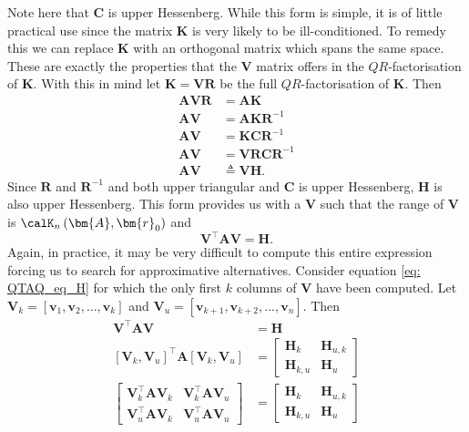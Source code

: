 Note here that $\bm{C}$ is upper Hessenberg. While this form is simple, it is of little practical use since the matrix $\bm{K}$ is very likely to be ill-conditioned. To remedy this we can replace $\bm{K}$ with an orthogonal matrix which spans the same space. These are exactly the properties that the $\bm{V}$ matrix offers in the $QR$-factorisation of $\bm{K}$. With this in mind let $\bm{K} = \bm{V} \bm{R}$ be the full $QR$-factorisation of $\bm{K}$. Then
\begin{align*}
    \bm{A} \bm{V} \bm{R} & = \bm{A} \bm{K}                    \\
    \bm{A} \bm{V}        & = \bm{A} \bm{K} \bm{R}^{-1}        \\
    \bm{A} \bm{V}        & = \bm{K} \bm{C} \bm{R}^{-1}        \\
    \bm{A} \bm{V}        & = \bm{V} \bm{R} \bm{C} \bm{R}^{-1} \\
    \bm{A} \bm{V}        & \triangleq \bm{V} \bm{H}.
\end{align*}
Since $\bm{R}$ and $\bm{R}^{-1}$ and both upper triangular and $\bm{C}$ is upper Hessenberg, $\bm{H}$ is also upper Hessenberg. This form provides us with a $\bm{V}$ such that the range of $\bm{V}$ is $\calK_{n} \left( \bm{A}, \bm{r}_0 \right)$ and
\begin{equation}\label{eq: QTAQ_eq_H}
    \bm{V}^{\intercal} \bm{A} \bm{V} = \bm{H}.
\end{equation}
Again, in practice, it may be very difficult to compute this entire expression forcing us to search for approximative alternatives. Consider equation \ref{eq: QTAQ_eq_H} for which the only first $k$ columns of $\bm{V}$ have been computed. Let $\bm{V}_k = \left[ \bm{v}_1 , \bm{v}_2 , \ldots , \bm{v}_k \right]$ and $\bm{V}_u = \left[ \bm{v}_{k+1} , \bm{v}_{k+2} , \ldots , \bm{v}_{n} \right]$. Then
\begin{align*}
    \bm{V}^{\intercal} \bm{A} \bm{V}                                                         & = \bm{H} \\
    \left[ \bm{V}_k , \bm{V}_u \right]^{\intercal} \bm{A} \left[ \bm{V}_k , \bm{V}_u \right] & =
    \begin{bmatrix}
        \bm{H}_k     & \bm{H}_{u,k} \\
        \bm{H}_{k,u} & \bm{H}_{u}
    \end{bmatrix}                                                                           \\
    \begin{bmatrix}
        \bm{V}_{k}^{\intercal} \bm{A} \bm{V}_{k} & \bm{V}_{k}^{\intercal} \bm{A} \bm{V}_{u} \\
        \bm{V}_{u}^{\intercal} \bm{A} \bm{V}_{k} & \bm{V}_{u}^{\intercal} \bm{A} \bm{V}_{u}
    \end{bmatrix}
                                                                                             & =
    \begin{bmatrix}
        \bm{H}_k     & \bm{H}_{u,k} \\
        \bm{H}_{k,u} & \bm{H}_{u}
    \end{bmatrix}
\end{align*}
